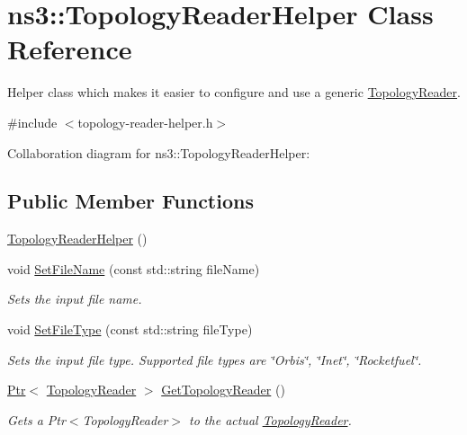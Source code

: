 \hypertarget{classns3_1_1TopologyReaderHelper}{}\section{ns3\+:\+:Topology\+Reader\+Helper Class Reference}
\label{classns3_1_1TopologyReaderHelper}


Helper class which makes it easier to configure and use a generic \hyperlink{classns3_1_1TopologyReader}{Topology\+Reader}.  




{\ttfamily \#include $<$topology-\/reader-\/helper.\+h$>$}



Collaboration diagram for ns3\+:\+:Topology\+Reader\+Helper\+:
\subsection*{Public Member Functions}
\begin{DoxyCompactItemize}
\item 
\hyperlink{classns3_1_1TopologyReaderHelper_a6ecd321265b4982e36058b4cb7ab2e86}{Topology\+Reader\+Helper} ()
\item 
void \hyperlink{classns3_1_1TopologyReaderHelper_aadb5ec87fde6aba01d6a1822c8d42e89}{Set\+File\+Name} (const std\+::string file\+Name)
\begin{DoxyCompactList}\small\item\em Sets the input file name. \end{DoxyCompactList}\item 
void \hyperlink{classns3_1_1TopologyReaderHelper_a5365b0f002b20399917d4b832a52bdb2}{Set\+File\+Type} (const std\+::string file\+Type)
\begin{DoxyCompactList}\small\item\em Sets the input file type. Supported file types are \char`\"{}\+Orbis\char`\"{}, \char`\"{}\+Inet\char`\"{}, \char`\"{}\+Rocketfuel\char`\"{}. \end{DoxyCompactList}\item 
\hyperlink{classns3_1_1Ptr}{Ptr}$<$ \hyperlink{classns3_1_1TopologyReader}{Topology\+Reader} $>$ \hyperlink{classns3_1_1TopologyReaderHelper_aaa2058c9cdebfe726cde28bbfc1562f4}{Get\+Topology\+Reader} ()
\begin{DoxyCompactList}\small\item\em Gets a Ptr$<$\+Topology\+Reader$>$ to the actual \hyperlink{classns3_1_1TopologyReader}{Topology\+Reader}. \end{DoxyCompactList}\end{DoxyCompactItemize}
